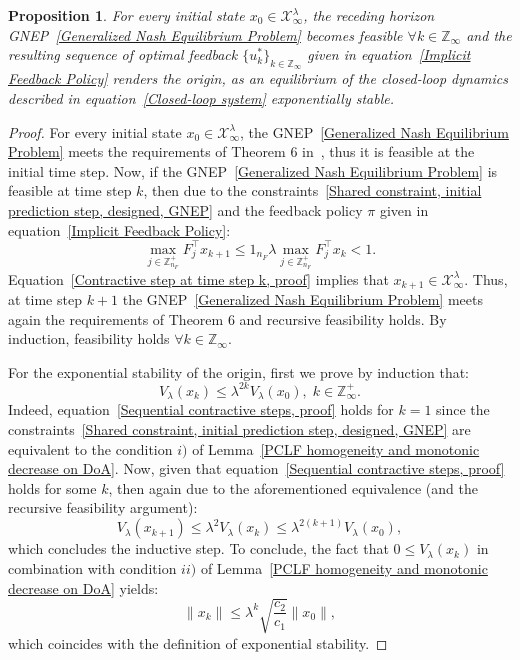 \documentclass[letterpaper, 10 pt, conference]{ieeeconf}  %
\newcommand{\Z}{\mathbb{Z}}
\newcommand{\mc}[1]{\mathcal{#1}}
\newtheorem{proposition}{Proposition}
\begin{document}
\begin{proposition}
For every initial state $x_{0} \in \mc{X}^{\lambda}_{\infty}$, the receding horizon GNEP~\eqref{Generalized Nash Equilibrium Problem} becomes feasible $\forall k \in \Z_{\infty}$ and the resulting sequence of optimal feedback $\{u^{*}_{k}\}_{k \in \Z_{\infty}}$ given in equation~\eqref{Implicit Feedback Policy} renders the origin, as an equilibrium of the closed-loop dynamics described in equation~\eqref{Closed-loop system} exponentially stable.
\end{proposition}
\begin{proof}
For every initial state $x_{0} \in \mc{X}^{\lambda}_{\infty}$, the GNEP~\eqref{Generalized Nash Equilibrium Problem} meets the requirements of Theorem 6 in~\cite{Facchinei2010gnep}, thus it is feasible at the initial time step. Now, if the GNEP~\eqref{Generalized Nash Equilibrium Problem} is feasible at time step $k$, then due to the constraints~\eqref{Shared constraint, initial prediction step, designed, GNEP} and the feedback policy $\pi$ given in equation~\eqref{Implicit Feedback Policy}:
\begin{equation}\label{Contractive step at time step k, proof}
\max_{j \in \Z^{+}_{n_{F}}} F^{\top}_{j}x_{k+1} \leq 1_{n_{F}} \lambda \max_{j \in \Z^{+}_{n_{F}}} F^{\top}_{j}x_{k} < 1.
\end{equation}
Equation~\eqref{Contractive step at time step k, proof} implies that $x_{k+1} \in \mc{X}^{\lambda}_{\infty}$. Thus, at time step $k+1$ the GNEP~\eqref{Generalized Nash Equilibrium Problem} meets again the requirements of Theorem 6 and recursive feasibility holds. By induction, feasibility holds $\forall k \in \Z_{\infty}$.

For the exponential stability of the origin, first we prove by induction that:
\begin{equation}\label{Sequential contractive steps, proof}
V_{\lambda}(x_{k}) \leq \lambda^{2k} V_{\lambda}(x_{0}),\; k \in \Z^{+}_{\infty}.
\end{equation}
Indeed, equation~\eqref{Sequential contractive steps, proof} holds for $k=1$ since the constraints~\eqref{Shared constraint, initial prediction step, designed, GNEP} are equivalent to the condition $i)$ of Lemma~\ref{PCLF homogeneity and monotonic decrease on DoA}. Now, given that equation~\eqref{Sequential contractive steps, proof} holds for some $k$, then again due to the aforementioned equivalence (and the recursive feasibility argument):
\begin{equation}
V_{\lambda}(x_{k+1}) \leq \lambda^{2}V_{\lambda}(x_{k}) \leq \lambda^{2(k+1)}V_{\lambda}(x_{0}),
\end{equation}
which concludes the inductive step. To conclude, the fact that $0 \leq V_{\lambda}(x_{k})$ in combination with condition $ii)$ of  Lemma~\ref{PCLF homogeneity and monotonic decrease on DoA} yields:
\begin{equation}\label{Exponential Stability}
\|x_{k}\| \leq \lambda^{k} \sqrt{\frac{c_{2}}{c_{1}}}\|x_{0}\|,
\end{equation}
which coincides with the definition of exponential stability.
\end{proof}
\end{document}
